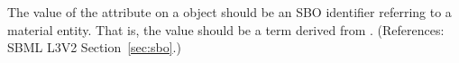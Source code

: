 The value of the attribute  on a \Species object should be
an SBO identifier referring to a material entity.  That is, the value
should be a term derived from \sbomaterialentity.  (References: SBML L3V2
Section~\ref{sec:sbo}.)
